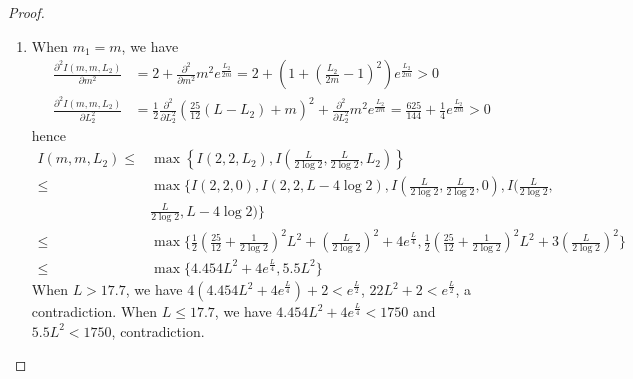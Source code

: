\documentclass[11pt, a4paper]{article}
\theoremstyle{definition}
\theoremstyle{remark}
\newcommand{\abs}[1]{\left| #1 \right|}
\newcommand{\bracket}[1]{\left( #1 \right)}
\begin{document}
\begin{proof}
\begin{enumerate}

\item

When $m_1=m$, we have
\begin{align*}
\frac{\partial^2I(m,m,L_2)}{\partial m^2}&=2+\frac{\partial^2}{\partial m^2}m^2e^{\frac{L_2}{2m}}=2+\bracket{1+\bracket{\frac{L_2}{2m}-1}^2}e^{\frac{L_2}{2m}}>0\\
\frac{\partial^2I(m,m,L_2)}{\partial L_2^2}&=\frac12\frac{\partial^2}{\partial L_2^2}\bracket{\frac{25}{12}(L-L_2)+m}^2+\frac{\partial^2}{\partial L_2^2}m^2e^{\frac{L_2}{2m}}=\frac{625}{144}+\frac14e^{\frac{L_2}{2m}}>0
\end{align*}
hence
\begin{align*}
 I(m,m,L_2)\leqslant&\max\left\{I(2,2,L_2),I(\frac{L}{2\log2},\frac{L}{2\log2},L_2)\right\}\\
\leqslant&\max\{I(2,2,0),I(2,2,L-4\log2),I(\frac{L}{2\log2},\frac{L}{2\log2},0),I(\frac{L}{2\log2},\\
&\frac{L}{2\log2},L-4\log2)\}\\
\leqslant&\max\{\frac12\bracket{\frac{25}{12}+\frac1{2\log2}}^2L^2+(\frac{L}{2\log2})^2+4e^{\frac{L}4}, \frac12\bracket{\frac{25}{12}+\frac1{2\log2}}^2L^2+3(\frac{L}{2\log2})^2\}\\
\leqslant&\max\{4.454L^2+4e^{\frac{L}4}, 5.5L^2\}
\end{align*}
When $L>17.7$, we have $4(4.454L^2+4e^{\frac{L}4})+2<e^{\frac{L}2}$, $22L^2+2<e^{\frac{L}2}$, a contradiction. When $L\leqslant17.7$, we have $4.454L^2+4e^{\frac{L}4}<1750$ and $5.5L^2<1750$, contradiction.


\end{enumerate}


\end{proof}
\end{document}
